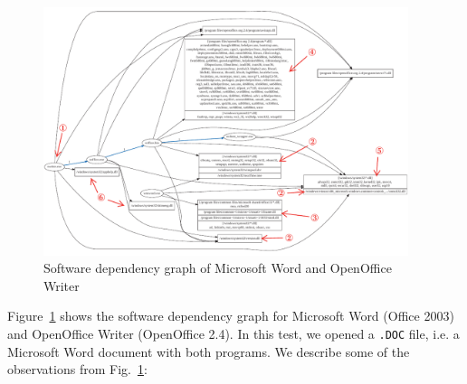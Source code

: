 \begin{figure}
\includegraphics[keepaspectratio,width=0.95\textwidth,height=0.95\textheight]{depvis/word-group-annot.pdf}
\caption{Software dependency graph of Microsoft Word and OpenOffice Writer}
\label{fig:depvis-word}
\end{figure}

Figure~\ref{fig:depvis-word} shows the software dependency graph for Microsoft Word
(Office 2003) and OpenOffice Writer (OpenOffice 2.4).
In this test, we opened a {\tt .DOC} file, i.e. a Microsoft Word document
with both programs.
We describe some of the observations from Fig.~\ref{fig:depvis-word}:

